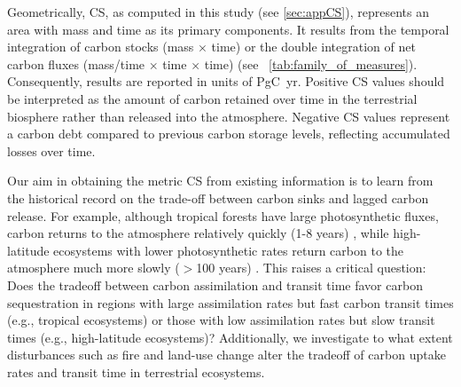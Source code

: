 \documentclass[ProofPDF]{./Styles/Jnls-Template-V3}
\begin{document}
Geometrically, CS, as computed in this study (see \ref{sec:appCS}), represents an area with mass and time as its primary components. It results from the temporal integration of carbon stocks (mass $\times$ time) or the double integration of net carbon fluxes (mass/time $\times$ time $\times$ time) (see ~\ref{tab:family_of_measures}). Consequently, results are reported in units of PgC~yr. Positive CS values should be interpreted as the amount of carbon retained over time in the terrestrial biosphere rather than released into the atmosphere. Negative CS values represent a carbon debt compared to previous carbon storage levels, reflecting accumulated losses over time.

Our aim in obtaining the metric CS from existing information is to learn from the historical record on the trade-off between carbon sinks and lagged carbon release. For example, although tropical forests have large photosynthetic fluxes, carbon returns to the atmosphere relatively quickly (1-8 years) \citep{Sierra2021JE,Chanca2025}, while high-latitude ecosystems with lower photosynthetic rates return carbon to the atmosphere much more slowly ($>$100 years) \citep{Carvalhais2014,Lu2018}. This raises a critical question: Does the tradeoff between carbon assimilation and transit time favor carbon sequestration in regions with large assimilation rates but fast carbon transit times (e.g., tropical ecosystems) or those with low assimilation rates but slow transit times (e.g., high-latitude ecosystems)? Additionally, we investigate to what extent disturbances such as fire and land-use change alter the tradeoff of carbon uptake rates and transit time in terrestrial ecosystems.
\end{document}
